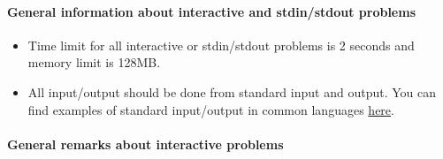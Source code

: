\hypertarget{info-sheet}{}
\paragraph{General information about interactive and stdin/stdout problems}
\begin{itemize}
    \item Time limit for all interactive or stdin/stdout problems is 2 seconds and memory limit is 128MB.
    \item All input/output should be done from standard input and output.
    You can find examples of standard input/output in common languages \href{http://ejudge.rau.am/help.html}{here}.
\end{itemize}

\paragraph{General remarks about interactive problems}
\hypertarget{info-interactive}{}
